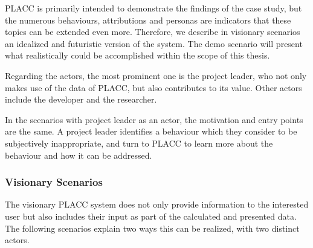 PLACC is primarily intended to demonstrate the findings of the case study,  but the numerous behaviours,  attributions and personas are indicators that these topics can be extended even more.  Therefore,  we describe in visionary scenarios an idealized and futuristic version of the system.  The demo scenario will present what realistically could be accomplished within the scope of this thesis.

Regarding the actors, the most prominent one is the project leader, who not only makes use of the data of PLACC, but also contributes to its value.  Other actors include the developer and the researcher.

In the scenarios with project leader as an actor, the motivation and entry points are the same.  A project leader identifies a behaviour which they consider to be subjectively inappropriate, and turn to PLACC to learn more about the behaviour and how it can be addressed.

\subsubsection{Visionary Scenarios}


The visionary PLACC system does not only provide information to the interested user but also includes their input as part of the calculated and presented data.  The following scenarios explain two ways this can be realized,  with two distinct actors. 


